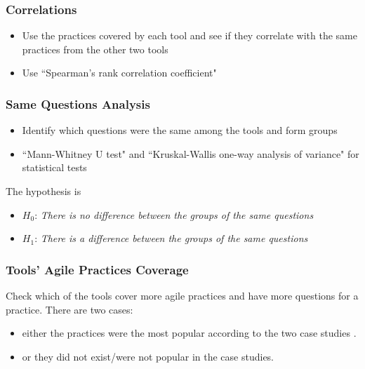 \clearpage

%

\subsubsection{Correlations}

\begin{itemize}
	\item Use the practices covered by each tool and see if they correlate with the same practices from the other two tools
	\item Use ``Spearman's rank correlation coefficient"
\end{itemize}

\clearpage

\subsubsection{Same Questions Analysis}

\begin{itemize}
	\item Identify which questions were the same among the tools and form groups
	\item ``Mann-Whitney U test" and ``Kruskal-Wallis one-way analysis of variance" for statistical tests
\end{itemize}

The hypothesis is

\begin{itemize}[label={}]
	\item $H_0$: \textit{There is no difference between the groups of the same questions}
	\item $H_1$: \textit{There is a difference between the groups of the same questions}
\end{itemize}

\clearpage

\subsubsection{Tools' Agile Practices Coverage}

Check which of the tools cover more agile practices and have more questions for a practice. There are two cases:

\begin{itemize}
	\item either the practices were the most popular according to the two case studies \cite{Williams_Microsoft, laurie_williams}.
	\item or they did not exist/were not popular in the case studies.
\end{itemize}

\clearpage